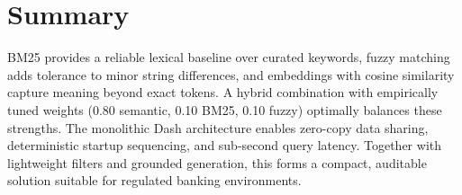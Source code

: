 \section{Summary}
BM25 provides a reliable lexical baseline over curated keywords, fuzzy matching adds tolerance to minor string differences, and embeddings with cosine similarity capture meaning beyond exact tokens. A hybrid combination with empirically tuned weights (0.80 semantic, 0.10 BM25, 0.10 fuzzy) optimally balances these strengths. The monolithic Dash architecture enables zero-copy data sharing, deterministic startup sequencing, and sub-second query latency. Together with lightweight filters and grounded generation, this forms a compact, auditable solution suitable for regulated banking environments.
